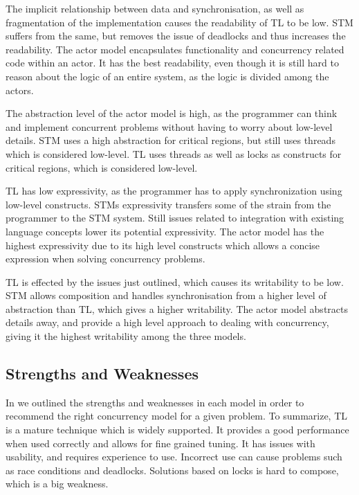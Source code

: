 The implicit relationship between data and synchronisation, as well as fragmentation of the implementation causes the readability of \ac{TL} to be low. \ac{STM} suffers from the same, but removes the issue of deadlocks and thus increases the readability. The actor model encapsulates functionality and concurrency related code within an actor. It has the best readability, even though it is still hard to reason about the logic of an entire system, as the logic is divided among the actors.

The abstraction level of the actor model is high, as the programmer can think and implement concurrent problems without having to worry about low-level details. \ac{STM} uses a high abstraction for critical regions, but still uses threads which is considered low-level. \ac{TL} uses threads as well as locks as constructs for critical regions, which is considered low-level.  

\ac{TL} has low expressivity, as the programmer has to apply synchronization using low-level constructs. \acp{STM} expressivity transfers some of the strain from the programmer to the \ac{STM} system. Still issues related to integration with existing language concepts lower its potential expressivity. The actor model has the highest expressivity due to its high level constructs which allows a concise expression when solving concurrency problems.

\ac{TL} is effected by the issues just outlined, which causes its writability to be low. \ac{STM} allows composition and handles synchronisation from a higher level of abstraction than \ac{TL}, which gives a higher writability. The actor model abstracts details away, and provide a high level approach to dealing with concurrency, giving it the highest writability among the three models.

\subsection{Strengths and Weaknesses}
In  we outlined the strengths and weaknesses in each model in order to recommend the right concurrency model for a given problem. To summarize, \ac{TL} is a mature technique which is widely supported. It provides a good performance when used correctly and allows for fine grained tuning. It has issues with usability, and requires experience to use. Incorrect use can cause problems such as race conditions and deadlocks. Solutions based on locks is hard to compose, which is a big weakness.

